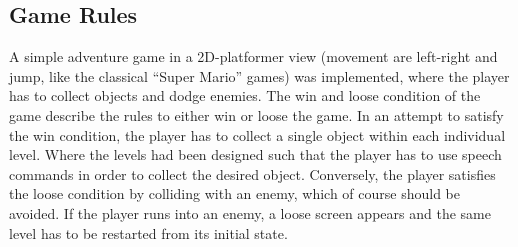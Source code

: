 \subsection{Game Rules}\label{sec:game_design_rules}
A simple adventure game in a 2D-platformer view (movement are left-right and jump, like the classical \enquote{Super Mario} games) was implemented, where the player has to collect objects and dodge enemies.
The win and loose condition of the game describe the rules to either win or loose the game.
In an attempt to satisfy the win condition, the player has to collect a single object within each individual level.
Where the levels had been designed such that the player has to use speech commands in order to collect the desired object.
Conversely, the player satisfies the loose condition by colliding with an enemy, which of course should be avoided.
If the player runs into an enemy, a loose screen appears and the same level has to be restarted from its initial state.



